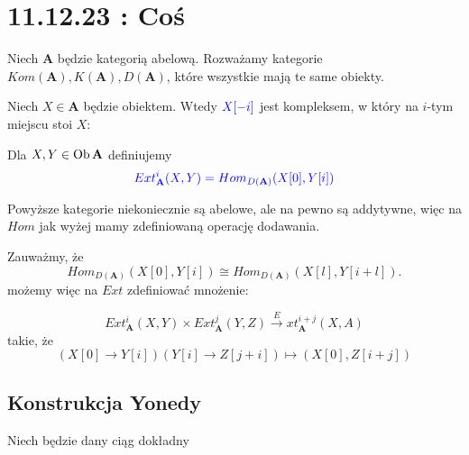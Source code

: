 \section{11.12.23 : Coś}

\begin{definition}
  Niech $\mathbf{A}$ będzie kategorią abelową. Rozważamy kategorie $Kom(\mathbf{A}), K(\mathbf{A}), D(\mathbf{A})$, które wszystkie mają te same obiekty.

  Niech $X\in\mathbf{A}$ będzie obiektem. Wtedy $\color{blue}X[-i]$ jest kompleksem, w który na $i$-tym miejscu stoi $X$:
  \begin{center}\end{center}

  Dla $X,Y\in\operatorname{Ob}\mathbf{A}$ definiujemy
  $$\color{blue}Ext_{\mathbf{A}}^i(X, Y)=Hom_{D(\mathbf{A})}(X[0], Y[i])$$
\end{definition}

Powyższe kategorie niekoniecznie są abelowe, ale na pewno są addytywne, więc na $Hom$ jak wyżej mamy zdefiniowaną operację dodawania.

Zauważmy, że
$$Hom_{D(\mathbf{A})}(X[0], Y[i])\cong Hom_{D(\mathbf{A})}(X[l], Y[i+l]).$$
możemy więc na $Ext$ zdefiniować mnożenie:
\begin{definition}
  $$Ext_{\mathbf{A}}^i(X, Y)\times Ext_{\mathbf{A}}^j(Y, Z)\xrightarrow Ext_{\mathbf{A}}^{i+j}(X, A)$$
  takie, że
  $$(X[0]\to Y[i])(Y[i]\to Z[j+i])\mapsto(X[0], Z[i+j])$$
\end{definition}

\subsection{Konstrukcja Yonedy}

Niech będzie dany ciąg dokładny
\begin{center}\end{center}


